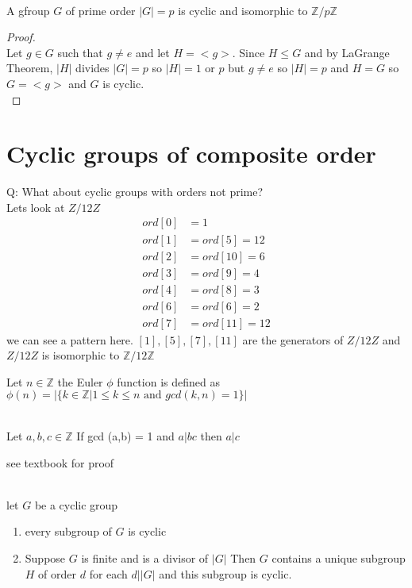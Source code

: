 \documentclass{article}
\begin{document}
\begin{proposition}[2.7.2] \leavevmode \\ 
    A gfroup $G$ of prime order $|G| = p$ is cyclic and isomorphic to $\mathbb{Z} / p\mathbb{Z}$
\end{proposition}
\begin{proof} \leavevmode \\ 
    Let $g \in G$ such that $g \not = e$ and let $H = <g>$. Since $H \leq G$ and by LaGrange Theorem, $|H|$ divides $|G| = p$ so $|H| = 1$ or $p$ but $g \not = e$ so $|H| = p$ and $H = G$ so $G = <g>$ and $G$ is cyclic. \\
\end{proof}

\section*{Cyclic groups of composite order}
Q: What about cyclic groups with orders not prime? \\ 
Lets look at $Z / 12Z$ \\
\begin{align*}
    ord[0] &= 1 \\
    ord[1] &= ord[5] = 12 \\
    ord[2] &= ord[10] = 6 \\
    ord[3] &= ord[9] = 4 \\
    ord[4] &= ord[8] = 3 \\
    ord[6] &= ord[6] = 2 \\ 
    ord[7] &= ord[11] = 12
\end{align*}
we can see a pattern here.
$[1], [5], [7], [11]$ are the generators of $Z / 12Z$ and $Z / 12Z$ is isomorphic to $\mathbb{Z} / 12\mathbb{Z}$

\begin{definition}
    Let $n \in \mathbb{Z}$ the Euler $\phi$ function is defined as $\phi(n) = | \{ k \in \mathbb{Z} | 1 \leq k \leq n \text{ and } gcd(k,n) = 1 \} |$
\end{definition}

\begin{lemma}[Cor 1.5.10] \leavevmode \\
     Let $a, b, c \in \mathbb{Z}$ If gcd (a,b) = 1 and $a | bc$ then $a|c$ 
\end{lemma} see textbook for proof 




\begin{proposition}[2.7.4] \leavevmode \\ 
    let $G$ be a cyclic group 
    \begin{enumerate}
        \item every subgroup of $G$ is cyclic 
        \item Suppose $G$ is finite and is a divisor of $|G|$ Then $G$ contains a unique subgroup $H$ of order $d$ for each $d | |G|$ and this subgroup is cyclic.
    \end{enumerate}
    
\end{proposition}
\end{document}
